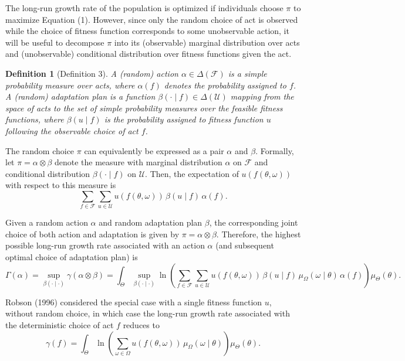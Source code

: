 \documentclass[12pt,a4paper]{article}
\newenvironment{original}
  {\par\noindent\color{black}\smallskip}
  {\par\smallskip}
\newtheorem{definition}[theorem]{Definition}
\begin{document}
\begin{original}
The long-run growth rate of the population is optimized if individuals choose $\pi$ to maximize Equation (1). However, since only the random choice of act is observed while the choice of fitness function corresponds to some unobservable action, it will be useful to decompose $\pi$ into its (observable) marginal distribution over acts and (unobservable) conditional distribution over fitness functions given the act.

\begin{definition}[Definition 3]
A (random) action $\alpha \in \Delta(\mathcal{F})$ is a simple probability measure over acts, where $\alpha(f)$ denotes the probability assigned to $f$. A (random) adaptation plan is a function $\beta(\cdot \mid f) \in \Delta(\mathcal{U})$ mapping from the space of acts to the set of simple probability measures over the feasible fitness functions, where $\beta(u \mid f)$ is the probability assigned to fitness function $u$ following the observable choice of act $f$.
\end{definition}

The random choice $\pi$ can equivalently be expressed as a pair $\alpha$ and $\beta$. Formally, let $\pi = \alpha \otimes \beta$ denote the measure with marginal distribution $\alpha$ on $\mathcal{F}$ and conditional distribution $\beta(\cdot \mid f)$ on $\mathcal{U}$. Then, the expectation of $u(f(\theta, \omega))$ with respect to this measure is
\[
\sum_{f \in \mathcal{F}} \sum_{u \in \mathcal{U}} u(f(\theta, \omega)) \, \beta(u \mid f) \, \alpha(f).
\]

Given a random action $\alpha$ and random adaptation plan $\beta$, the corresponding joint choice of both action and adaptation is given by $\pi = \alpha \otimes \beta$. Therefore, the highest possible long-run growth rate associated with an action $\alpha$ (and subsequent optimal choice of adaptation plan) is
\begin{equation}\label{eq:2}
\Gamma(\alpha) = \sup_{\beta(\cdot \mid \cdot)} \gamma(\alpha \otimes \beta)
= \int_{\Theta} \sup_{\beta(\cdot \mid \cdot)} \ln\!\left( \sum_{f \in \mathcal{F}} \sum_{u \in \mathcal{U}} u(f(\theta, \omega)) \, \beta(u \mid f) \, \mu_\Omega(\omega \mid \theta) \, \alpha(f) \right) \mu_\Theta(\theta).
\end{equation}

Robson (1996) considered the special case with a single fitness function $u$, without random choice, in which case the long-run growth rate associated with the deterministic choice of act $f$ reduces to
\begin{equation}\label{eq:3}
\gamma(f) = \int_{\Theta} \ln\!\left( \sum_{\omega \in \Omega} u(f(\theta, \omega)) \, \mu_\Omega(\omega \mid \theta) \right) \mu_\Theta(\theta).
\end{equation}
\end{original}
\end{document}
